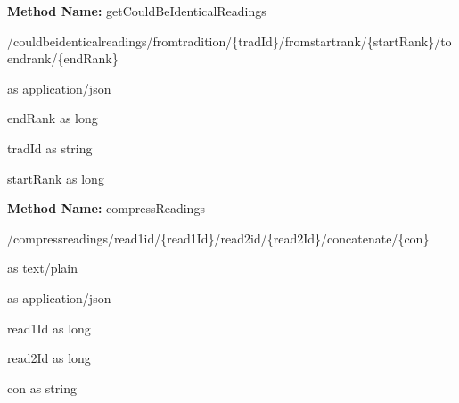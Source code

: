 \textbf{Method Name: }getCouldBeIdenticalReadings
\begin{get}
/couldbeidenticalreadings/fromtradition/\{tradId\}/fromstartrank/\{startRank\}/toendrank/\{endRank\}
\end{get}
\begin{response}
 as application/json
\end{response}
\begin{parameter}
endRank as long
\end{parameter}
\begin{parameter}
tradId as string
\end{parameter}
\begin{parameter}
startRank as long
\end{parameter}
\textbf{Method Name: }compressReadings
\begin{post}
/compressreadings/read1id/\{read1Id\}/read2id/\{read2Id\}/concatenate/\{con\}
\end{post}
\begin{request}
 as text/plain
\end{request}
\begin{response}
 as application/json
\end{response}
\begin{parameter}
read1Id as long
\end{parameter}
\begin{parameter}
read2Id as long
\end{parameter}
\begin{parameter}
con as string
\end{parameter}
